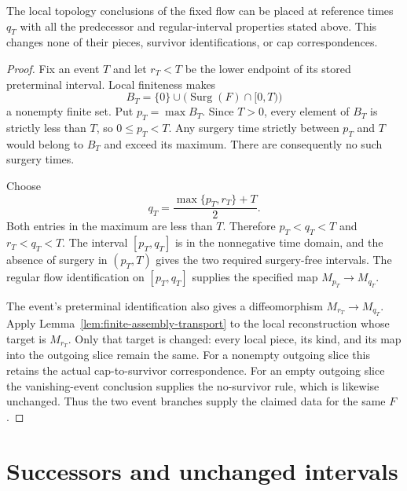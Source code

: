 \begin{lemma}
\label{lem:finite-event-references}
The local topology conclusions of the fixed flow can be placed at reference
times $q_T$ with all the predecessor and regular-interval properties stated
above.  This changes none of their pieces, survivor identifications, or
cap correspondences.
\end{lemma}

\begin{proof}
Fix an event $T$ and let $r_T<T$ be the lower endpoint of its stored
preterminal interval.  Local finiteness makes
\[
 B_T=\{0\}\cup\bigl(\operatorname{Surg}(F)\cap[0,T)\bigr)
\]
a nonempty finite set.  Put $p_T=\max B_T$.  Since $T>0$, every element
of $B_T$ is strictly less than $T$, so $0\leq p_T<T$.  Any surgery time
strictly between $p_T$ and $T$ would belong to $B_T$ and exceed its maximum.
There are consequently no such surgery times.

Choose
\[
 q_T=\frac{\max\{p_T,r_T\}+T}{2}.
\]
Both entries in the maximum are less than $T$.  Therefore
$p_T<q_T<T$ and $r_T<q_T<T$.  The interval $[p_T,q_T]$ is in the
nonnegative time domain, and the absence of surgery in $(p_T,T)$ gives
the two required surgery-free intervals.  The regular flow identification
on $[p_T,q_T]$ supplies the specified map $M_{p_T}\to M_{q_T}$.

The event's preterminal identification also gives a diffeomorphism
$M_{r_T}\to M_{q_T}$.  Apply
Lemma~\ref{lem:finite-assembly-transport} to the local reconstruction
whose target is $M_{r_T}$.  Only that target is changed: every local
piece, its kind, and its map into the outgoing slice remain the same.
For a nonempty outgoing slice this retains the actual cap-to-survivor
correspondence.  For an empty outgoing slice the vanishing-event
conclusion supplies the no-survivor rule, which is likewise unchanged.
Thus the two event branches supply the claimed data for the same $F$.
\end{proof}

\section{Successors and unchanged intervals}
\label{sec:finite-successors}

